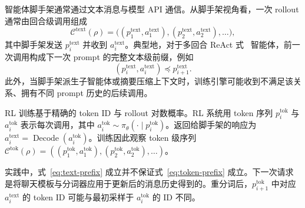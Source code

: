 智能体脚手架通常通过文本消息与模型 API 通信。从脚手架视角看，一次 rollout 通常由回合级调用组成
\begin{equation}
  \mathcal{C}^{\mathrm{text}}(\rho)
  = \bigl((p_1^{\mathrm{text}},a_1^{\mathrm{text}}),
  (p_2^{\mathrm{text}},a_2^{\mathrm{text}}),\ldots\bigr),
\end{equation}
其中脚手架发送 $p_i^{\mathrm{text}}$ 并收到 $a_i^{\mathrm{text}}$。典型地，对于多回合 ReAct 式~\cite{react} 智能体，前一次调用构成下一次 prompt 的完整文本级前缀，例如
\begin{equation}
  (p_i^{\mathrm{text}}, a_i^{\mathrm{text}}) \preceq p_{i+1}^{\mathrm{text}}.
  \label{eq:text-prefix}
\end{equation}
此外，当脚手架派生子智能体或摘要压缩上下文时，训练引擎可能收到不满足该关系、拥有不同 prompt 历史的后续调用。

RL 训练基于精确的 token ID 与 rollout 对数概率。RL 系统用 token 序列 $p_i^{\mathrm{tok}}$ 与 $a_i^{\mathrm{tok}}$ 表示每次调用，其中 $a_i^{\mathrm{tok}} \sim \pi_\theta(\cdot \mid p_i^{\mathrm{tok}})$。返回给脚手架的响应为 $a_i^{\mathrm{text}}=\operatorname{Decode}(a_i^{\mathrm{tok}})$。训练因此观察 token 级序列 $\mathcal{C}^{\mathrm{tok}}(\rho)=((p_1^{\mathrm{tok}},a_1^{\mathrm{tok}}), (p_2^{\mathrm{tok}},a_2^{\mathrm{tok}}),\ldots)$。


实践中，式~\ref{eq:text-prefix} 成立并不保证式~\ref{eq:token-prefix} 成立。下一次请求是将聊天模板与分词器应用于更新后的消息历史得到的。重分词后，$p_{i+1}^{\mathrm{tok}}$ 中对应 $a_i^{\mathrm{text}}$ 的 token ID 可能与最初采样于 $a_i^{\mathrm{tok}}$ 的 ID 不同。

